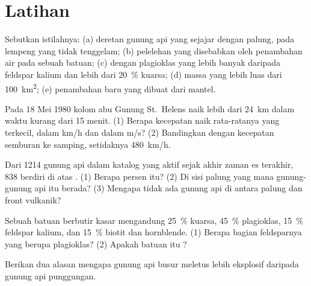 \section{Latihan}

\begin{exercise}[$\star$]\label{exo:g12:subduction-magmatism:1}
Sebutkan istilahnya: (a) deretan gunung api yang sejajar dengan palung, pada
lempeng yang tidak tenggelam; (b) pelelehan yang disebabkan oleh penambahan air
pada sebuah batuan; (c)  dengan plagioklas yang lebih banyak
daripada feldspar kalium dan lebih dari \qty{20}{\percent} kuarsa; (d) massa
 yang lebih luas dari \qty{100}{km^2}; (e) penambahan 
baru yang dibuat dari mantel.
\end{exercise}

\begin{exercise}[$\star$]\label{exo:g12:subduction-magmatism:2}
Pada 18 Mei 1980 kolom abu Gunung St.~Helens naik lebih dari \qty{24}{km}
dalam waktu kurang dari 15 menit. (1) Berapa kecepatan naik rata-ratanya yang
terkecil, dalam \unit{km/h} dan dalam \unit{m/s}? (2) Bandingkan dengan
kecepatan semburan ke samping, setidaknya \qty{480}{km/h}.
\end{exercise}

\begin{exercise}[$\star$]\label{exo:g12:subduction-magmatism:3}
Dari 1214 gunung api dalam katalog yang aktif sejak akhir zaman es terakhir,
838 berdiri di atas . (1) Berapa persen itu? (2) Di sisi palung
yang mana gunung-gunung api itu berada? (3) Mengapa tidak ada gunung api di
antara palung dan front vulkanik?
\end{exercise}

\begin{exercise}[$\star$]\label{exo:g12:subduction-magmatism:4}
Sebuah batuan berbutir kasar mengandung \qty{25}{\percent} kuarsa,
\qty{45}{\percent} plagioklas, \qty{15}{\percent} feldspar kalium, dan
\qty{15}{\percent} biotit dan hornblende. (1) Berapa bagian feldsparnya yang
berupa plagioklas? (2) Apakah batuan itu ?
\end{exercise}

\begin{exercise}[$\star$]\label{exo:g12:subduction-magmatism:5}
Berikan dua alasan mengapa gunung api busur meletus lebih eksplosif daripada
gunung api punggungan.
\end{exercise}

